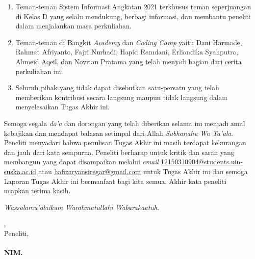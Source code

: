 \begin{enumerate}
	\item Teman-teman Sistem Informasi Angkatan 2021 terkhusus teman seperjuangan di Kelas D yang selalu mendukung, berbagi informasi, dan membantu peneliti dalam menjalankan masa perkuliahan.
	\item Teman-teman di Bangkit \textit{Academy} dan \textit{Coding Camp} yaitu Dani Harmade, Rahmat Afriyanto, Fajri Nurhadi, Hapid Ramdani, Erliandika Syahputra, Ahmeid Aqeil, dan Novrian Pratama yang telah menjadi bagian dari cerita perkuliahan ini.
	\item Seluruh pihak yang tidak dapat disebutkan satu-persatu yang telah memberikan kontribusi secara langsung maupun tidak langsung dalam menyelesaikan Tugas Akhir ini.
\end{enumerate}

Semoga segala \textit{do'a} dan dorongan yang telah diberikan selama ini menjadi amal kebajikan dan mendapat balasan setimpal dari Allah \textit{Subhanahu Wa Ta’ala}. Peneliti menyadari bahwa penulisan Tugas Akhir ini masih terdapat kekurangan dan jauh dari kata sempurna. Peneliti berharap untuk kritik dan saran yang membangun yang dapat disampaikan melalui \textit{email} \href{mailto:12150310904@students.uin-suska.ac.id}{12150310904@students.uin-suska.ac.id} atau \href{mailto:hafizaryansiregar@gmail.com}{hafizaryansiregar@gmail.com} untuk Tugas Akhir ini dan semoga Laporan Tugas Akhir ini bermanfaat bagi kita semua. Akhir kata peneliti ucapkan terima kasih.

\textit{Wassalamu’alaikum Warahmatullahi Wabarakaatuh.}

\vspace*{0.1cm}



\begin{flushright}
	\kota, \tanggalPersetujuan\\
	Peneliti,\\
	\vspace{2cm}
	\textbf{\underline{\penulis}\\
		\vspace{-0.15cm}
		NIM. \nim}

\end{flushright}
